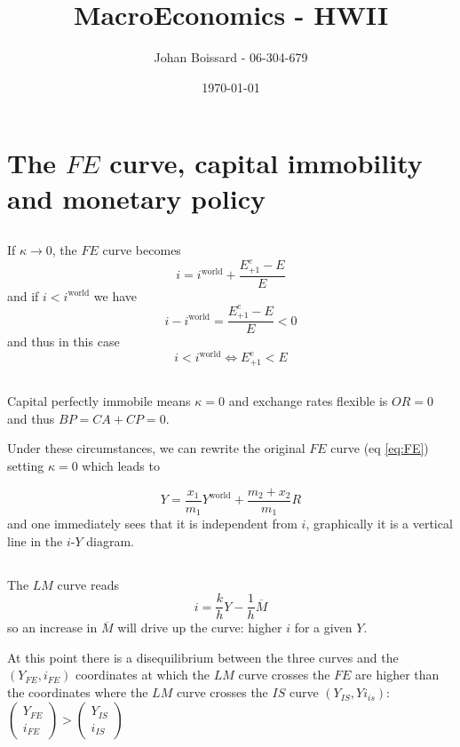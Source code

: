 \documentclass[a4paper] {scrartcl}
\author{Johan Boissard - 06-304-679}
\date{\today}
\title{MacroEconomics - HWII}
\begin{document}
\maketitle


\section{The $FE$ curve, capital immobility and monetary policy}
\subsection{ }
If $\kappa\rightarrow0$, the $FE$ curve becomes
\begin{equation}
	\label{eq:FE}
	i = i^{\text{world}} + \frac{E_{+1}^e-E}{E}
\end{equation}
and if $i<i^{\text{world}}$ we have
\begin{equation}
	i-i^{\text{world}} = \frac{E_{+1}^e-E}{E} <0
\end{equation}
and thus in this case
\begin{equation}
	i<i^{\text{world}} \Leftrightarrow E_{+1}^e <E
\end{equation}

\subsection{ }
Capital perfectly immobile means $\kappa = 0$ and exchange rates flexible is $OR=0$ and thus $BP=CA+CP=0$.

Under these circumstances, we can rewrite the original $FE$ curve (eq \ref{eq:FE}) setting $\kappa=0$ which leads to

\begin{equation}
	\label{eq:FEumformed}
	Y = \frac{x_1}{m_1}Y^{\text{world}}+\frac{m_2+x_2}{m_1}R
\end{equation}
and one immediately sees that it is independent from $i$, graphically it is a vertical line in the $i$-$Y$ diagram. 

\subsection{ }
The $LM$ curve reads
\begin{equation}
	i = \frac{k}{h}Y- \frac{1}{h}\overline M 
\end{equation}
so an increase in $\overline M$ will drive up the curve: higher $i$ for a given $Y$.

At this point there is a disequilibrium between the three curves and the $(Y_{FE},i_{FE})$ coordinates at which the $LM$ curve crosses the $FE$ are higher than the coordinates where the $LM$ curve crosses the $IS$ curve $(Y_{IS}, Yi_{is})$:
$\begin{pmatrix}
	Y_{FE}\\
	i_{FE}
\end{pmatrix}
>
\begin{pmatrix}
	Y_{IS}\\
	i_{IS}
\end{pmatrix}$
\end{document}
